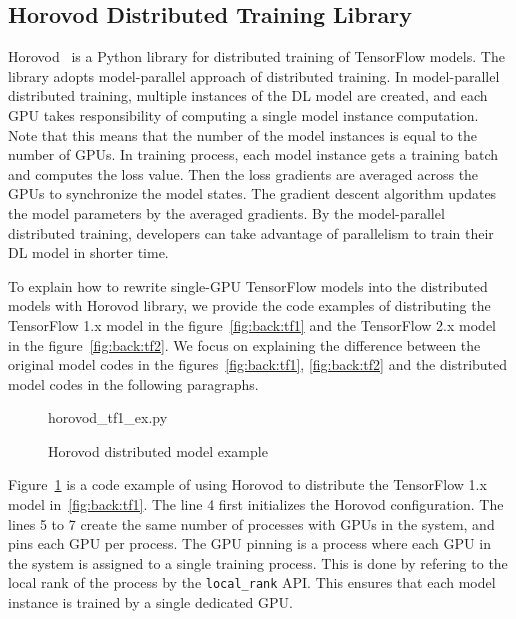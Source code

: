 \subsection{Horovod Distributed Training Library}

Horovod~\cite{sergeev2018horovod} is a Python library for distributed training 
of TensorFlow models. The library adopts model-parallel approach of distributed 
training. 
In model-parallel distributed training, multiple instances of the DL model
are created, and each GPU takes responsibility of computing a single model
instance computation. %
Note that this means that the number of the model instances 
is equal to the number of GPUs.
In training process, each model instance gets a training batch and computes the
loss value. Then the loss gradients are averaged across the GPUs to synchronize 
the model states. The gradient descent algorithm updates the model parameters by
the averaged gradients.
By the model-parallel distributed training, developers can take advantage of
parallelism to train their DL model in shorter time.

To explain how to rewrite single-GPU TensorFlow models into the distributed 
models with Horovod library, we provide the code examples of distributing 
the TensorFlow 1.x model in the figure~\ref{fig:back:tf1} and the TensorFlow
2.x model in the figure~\ref{fig:back:tf2}.
We focus on explaining the difference between the original model codes in
the figures~\ref{fig:back:tf1}, \ref{fig:back:tf2} and the distributed 
model codes in the following paragraphs.

\begin{figure}[ht!]
 
{horovod_tf1_ex.py}
  \caption{Horovod distributed model example}
\label{fig:back:hvd1} 
\end{figure}

Figure~\ref{fig:back:hvd1} is a code example of using Horovod to distribute
the TensorFlow 1.x model in~\ref{fig:back:tf1}.
The line 4 first initializes the Horovod configuration.
The lines 5 to 7 create the same number of processes with GPUs in the system,
and pins each GPU per process. 
The GPU pinning is a process where each GPU in the system is assigned to a 
single training process.
This is done by refering to the local rank of the process 
by the {\tt local\_rank} API.
This ensures that each model instance is trained by a single dedicated GPU.

